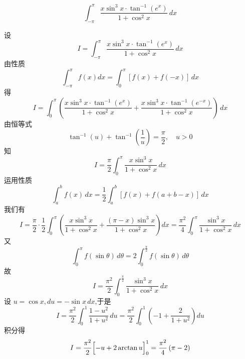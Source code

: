 \begin{questions}
    \question
    \[
    \int_{-\pi}^{\pi} \frac{x \sin^3 x \cdot \tan^{-1}(e^x)}{1 + \cos^2 x} \, dx
    \]
    \begin{solution}
        设
        \[
        I = \int_{-\pi}^{\pi} \frac{x \sin^3 x \cdot \tan^{-1}(e^x)}{1 + \cos^2 x} \, dx
        \]
        由性质
        \[
        \int_{-\pi}^{\pi} f(x) dx = \int_{0}^{\pi} [f(x)+f(-x)] \, dx
        \]
        得
        \[
        I = \int_0^{\pi} \left( \frac{x \sin^3 x \cdot \tan^{-1}(e^x)}{1 + \cos^2 x}
        + \frac{x \sin^3 x \cdot \tan^{-1}(e^{-x})}{1 + \cos^2 x} \right) \,dx
        \]
        由恒等式  
        \[
        \tan^{-1}(u) + \tan^{-1}\left(\dfrac1u\right) = \dfrac{\pi}{2} ,\quad u > 0
        \]
        知
        \[
        I = \frac{\pi}{2} \int_0^{\pi} \frac{x \sin^3 x}{1 + \cos^2 x} \, dx
        \]
        运用性质
        \[
        \int_{a}^{b} f(x) \,dx = \frac{1}{2} \int_{a}^{b} [f(x) + f(a+b-x)] \,dx
        \]
        我们有
        \[
        I = \frac{\pi}{2} \cdot \frac{1}{2} \int_0^{\pi} \left( \frac{x \sin^3 x}{1 + \cos^2 x} + \frac{(\pi - x) \sin^3 x}{1 + \cos^2 x} \right) dx = \frac{\pi^2}{4} \int_0^{\pi} \frac{\sin^3 x}{1 + \cos^2 x} \, dx 
        \]
        又 
        \[
        \int_0^\pi f(\sin\theta) \, d\theta = 2 \int_0^{\frac{\pi}{2}} f(\sin\theta) \, d\theta
        \]
        故 
        \[
        I = \frac{\pi^2}{2} \int_0^{\frac\pi2} \frac{\sin^3 x}{1 + \cos^2 x} \, dx 
        \]
        设 $u = \cos x,du = -\sin x \, dx$,于是
        \[
        I = \frac{\pi^2}{2} \int_{0}^{1} \frac{1 - u^2}{1 + u^2} \, du = \frac{\pi^2}{2} \int_{0}^{1} \left( -1 + \frac{2}{1 + u^2} \right)  du
        \]
        积分得
        \[
        I = \frac{\pi^2}{2} \Bigl[ -u + 2 \arctan u \Bigr]_{0}^{1} = \frac{\pi^2}{4} \left( \pi - 2 \right)
        \]
    \end{solution}


\end{questions}
